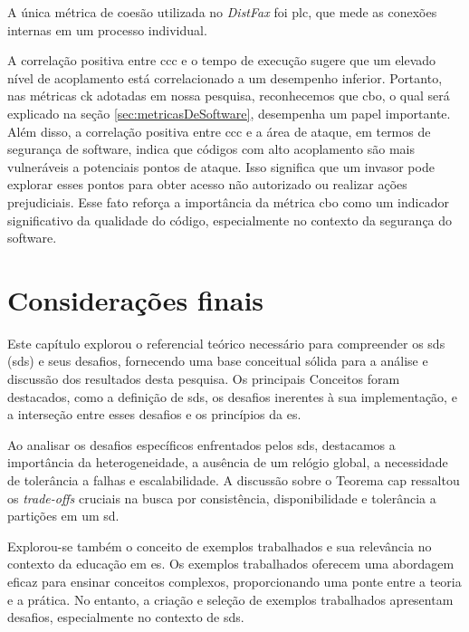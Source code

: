 A única métrica de coesão utilizada no \textit{DistFax} foi \gls{plc}, que mede as conexões internas em um processo individual.

A correlação positiva entre \gls{ccc} e o tempo de execução sugere que um elevado nível de acoplamento está correlacionado a um desempenho inferior. Portanto, nas métricas \gls{ck} adotadas em nossa pesquisa, reconhecemos que \gls{cbo}, o qual será explicado na seção \ref{sec:metricasDeSoftware}, desempenha um papel importante. Além disso, a correlação positiva entre \gls{ccc} e a área de ataque, em termos de segurança de software, indica que códigos com alto acoplamento são mais vulneráveis a potenciais pontos de ataque. Isso significa que um invasor pode explorar esses pontos para obter acesso não autorizado ou realizar ações prejudiciais. Esse fato reforça a importância da métrica \gls{cbo} como um indicador significativo da qualidade do código, especialmente no contexto da segurança do software.

\section{Considerações finais}
Este capítulo explorou o referencial teórico necessário para compreender os \gls{sds} (\gls{sds}) e seus desafios, fornecendo uma base conceitual sólida para a análise e discussão dos resultados desta pesquisa. Os principais Conceitos foram destacados, como a definição de \gls{sds}, os desafios inerentes à sua implementação, e a interseção entre esses desafios e os princípios da \gls{es}.

Ao analisar os desafios específicos enfrentados pelos \gls{sds}, destacamos a importância da heterogeneidade, a ausência de um relógio global, a necessidade de tolerância a falhas e escalabilidade. A discussão sobre o Teorema \gls{cap} ressaltou os \textit{trade-offs} cruciais na busca por consistência, disponibilidade e tolerância a partições em um \gls{sd}.

Explorou-se também o conceito de exemplos trabalhados e sua relevância no contexto da educação em \gls{es}. Os exemplos trabalhados oferecem uma abordagem eficaz para ensinar conceitos complexos, proporcionando uma ponte entre a teoria e a prática. No entanto, a criação e seleção de exemplos trabalhados apresentam desafios, especialmente no contexto de \gls{sds}.

